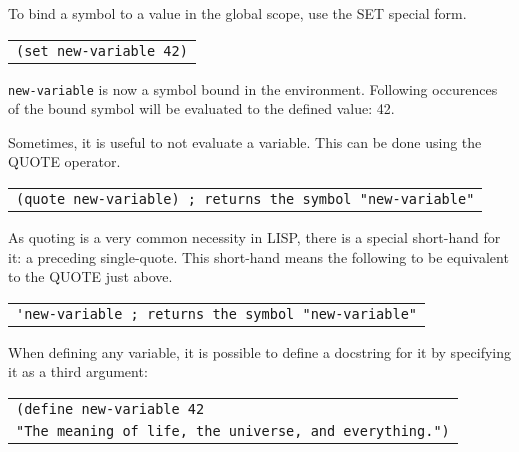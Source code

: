 \documentclass[
letterpaper,
oneside,
]{memoir}
\begin{document}
\filbreak

\noindent
To bind a symbol to a value in the global scope, use the SET special form.

\vspace{1em}
\begin{tabular}{l}
  \texttt{(set new-variable 42)} \\
\end{tabular}
\vspace{1em}

\noindent
\texttt{new-variable} is now a symbol bound in the environment. Following occurences of the bound symbol will be evaluated to the defined value: 42.

\filbreak

\vspace{1em}
\noindent
Sometimes, it is useful to not evaluate a variable. This can be done using the QUOTE operator.

\vspace{1em}
\begin{tabular}{l}
  \verb|(quote new-variable) ; returns the symbol "new-variable"| \\
\end{tabular}
\vspace{1em}

\filbreak

\noindent
As quoting is a very common necessity in LISP, there is a special short-hand for it: a preceding single-quote. This short-hand means the following to be equivalent to the QUOTE just above.

\vspace{1em}
\begin{tabular}{l}
\verb|'new-variable ; returns the symbol "new-variable"| \\
\end{tabular}
\vspace{1em}

\filbreak

\noindent
When defining any variable, it is possible to define a docstring for it by specifying it as a third argument:

\vspace{1em}
\begin{tabular}{l}
  \verb|(define new-variable 42 | \\
  \qquad\verb|"The meaning of life, the universe, and everything.")| \\
\end{tabular}
\vspace{1em}
\end{document}
